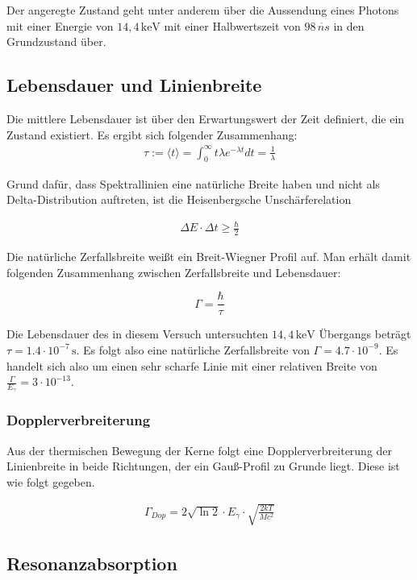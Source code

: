 Der angeregte Zustand geht unter anderem über die Aussendung eines Photons mit einer Energie von $14,4\,\mathrm{keV}$ mit einer Halbwertszeit von $98\,\mathring{ns}$ in den Grundzustand über.

\subsection{Lebensdauer und Linienbreite}

Die mittlere Lebensdauer ist über den Erwartungswert der Zeit definiert, die ein Zustand existiert. Es ergibt sich folgender Zusammenhang:
\begin{align}
\tau:=\langle t\rangle=\int_{0}^{\infty}t\lambda e^{-\lambda t}dt=\frac{1}{\lambda} 
\end{align}

Grund dafür, dass Spektrallinien eine natürliche Breite haben und nicht als Delta-Distribution auftreten, ist die Heisenbergsche Unschärferelation

\begin{align}
\Delta E\cdot\Delta t\geq\frac{\hbar}{2}
\end{align}


Die natürliche Zerfallsbreite weißt ein Breit-Wiegner Profil auf. Man erhält damit folgenden Zusammenhang zwischen Zerfallsbreite und Lebensdauer:

\[\Gamma=\frac{\hbar}{\tau}\]


Die Lebensdauer des in diesem Versuch untersuchten $14,4\,\mathrm{keV}$ Übergangs beträgt  $\tau = 1.4\cdot 10^{-7}\,\mathrm{s}$. Es folgt also eine natürliche Zerfallsbreite von $\Gamma = 4.7\cdot 10^{-9}$. Es handelt sich also um einen sehr scharfe Linie mit einer relativen Breite von $\frac{\Gamma}{E_{\gamma}}=3\cdot 10^{-13}$.


\subsubsection{Dopplerverbreiterung}

Aus der thermischen Bewegung der Kerne folgt eine Dopplerverbreiterung der Linienbreite in beide Richtungen, der ein Gauß-Profil zu Grunde liegt. Diese ist wie folgt gegeben.

\begin{align}
\Gamma_{Dop} = 2\sqrt{\ln2}\cdot E_{\gamma}\cdot\sqrt{\frac{2kT}{Mc^2}}
\end{align}



\subsection{Resonanzabsorption}

